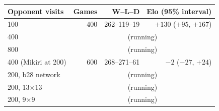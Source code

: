 \begin{tabular}{lrrr}
\toprule
Opponent visits & Games & W--L--D & Elo (95\% interval) \\
\midrule
100 & 400 & 262--119--19 & $+130$ ($+95$, $+167$) \\
400 & \multicolumn{3}{c}{(running)} \\
800 & \multicolumn{3}{c}{(running)} \\
400 (Mikiri at 200) & 600 & 268--271--61 & $-2$ ($-27$, $+24$) \\
200, b28 network & \multicolumn{3}{c}{(running)} \\
200, 13$\times$13 & \multicolumn{3}{c}{(running)} \\
200, 9$\times$9 & \multicolumn{3}{c}{(running)} \\
\bottomrule
\end{tabular}
